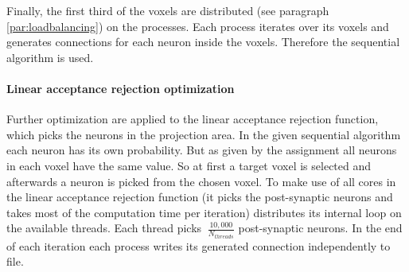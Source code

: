 Finally, the first third of the voxels are distributed (see paragraph \ref{par:loadbalancing}) on the processes.
Each process iterates over its voxels and generates connections for each neuron inside the voxels.
Therefore the sequential algorithm is used.

\paragraph{Linear acceptance rejection optimization}
\label{par:linearacceptancerejection}
Further optimization are applied to the linear acceptance rejection function,
which picks the neurons in the projection area.
In the given sequential algorithm each neuron has its own probability.
But as given by the assignment all neurons in each voxel have the same value.
So at first a target voxel is selected and afterwards a neuron is picked from the chosen voxel.
To make use of all cores in the linear acceptance rejection function
(it picks the post-synaptic neurons and takes most of the computation time per iteration)
distributes its internal loop on the available threads.
Each thread picks $~ \frac{10,000}{N_{threads}}$ post-synaptic neurons.
In the end of each iteration each process writes its generated connection independently to file.


